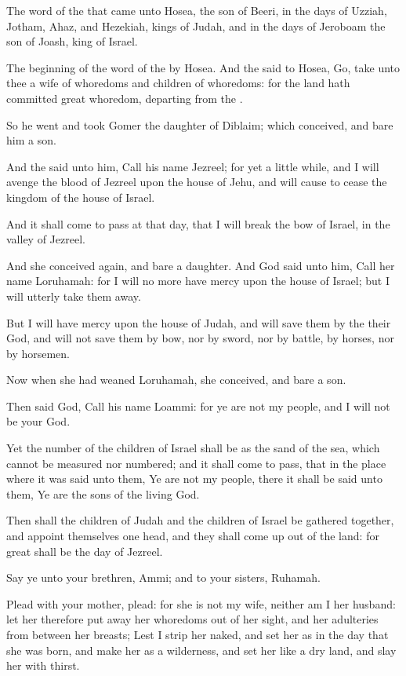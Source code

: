 \Chapter
\Verse The word of the \LORD that came unto Hosea, the son of Beeri, in the days of Uzziah, Jotham, Ahaz, and Hezekiah, kings of Judah, and in the days of Jeroboam the son of Joash, king of Israel.

\Verse The beginning of the word of the \LORD by Hosea. And the \LORD said to Hosea, Go, take unto thee a wife of whoredoms and children of whoredoms: for the land hath committed great whoredom, departing from the \LORD.

\Verse So he went and took Gomer the daughter of Diblaim; which conceived, and bare him a son.

\Verse And the \LORD said unto him, Call his name Jezreel; for yet a little while, and I will avenge the blood of Jezreel upon the house of Jehu, and will cause to cease the kingdom of the house of Israel.

\Verse And it shall come to pass at that day, that I will break the bow of Israel, in the valley of Jezreel.

\Verse And she conceived again, and bare a daughter. And God said unto him, Call her name Loruhamah: for I will no more have mercy upon the house of Israel; but I will utterly take them away.

\Verse But I will have mercy upon the house of Judah, and will save them by the \LORD their God, and will not save them by bow, nor by sword, nor by battle, by horses, nor by horsemen.

\Verse Now when she had weaned Loruhamah, she conceived, and bare a son.

\Verse Then said God, Call his name Loammi: for ye are not my people, and I will not be your God.

\Verse Yet the number of the children of Israel shall be as the sand of the sea, which cannot be measured nor numbered; and it shall come to pass, that in the place where it was said unto them, Ye are not my people, there it shall be said unto them, Ye are the sons of the living God.

\Verse Then shall the children of Judah and the children of Israel be gathered together, and appoint themselves one head, and they shall come up out of the land: for great shall be the day of Jezreel.


\Chapter
\Verse Say ye unto your brethren, Ammi; and to your sisters, Ruhamah.

\Verse Plead with your mother, plead: for she is not my wife, neither am I her husband: let her therefore put away her whoredoms out of her sight, and her adulteries from between her breasts; \Verse Lest I strip her naked, and set her as in the day that she was born, and make her as a wilderness, and set her like a dry land, and slay her with thirst.

